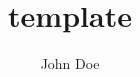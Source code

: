 \documentclass[12pt,fleqn,dvipdfmx]{jarticle}
\begin{document}
  \title{template}
  \author{John Doe}
  \date{}
  \maketitle
  \tableofcontents
  \newpage

  

  
\end{document}
